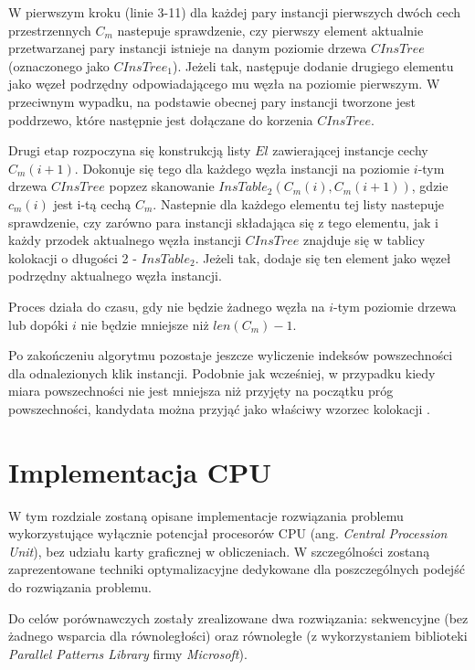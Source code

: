 \documentclass[12pt]{article}
\begin{document}
W pierwszym kroku (linie 3-11) dla każdej pary instancji pierwszych dwóch cech przestrzennych $ C_{m} $ nastepuje sprawdzenie, czy pierwszy element aktualnie przetwarzanej pary instancji istnieje na danym poziomie drzewa $ CInsTree $ (oznaczonego jako $CInsTree_{1}$). Jeżeli tak, następuje dodanie drugiego elementu jako węzeł podrzędny odpowiadającego mu węzła na poziomie pierwszym. W przeciwnym wypadku, na podstawie obecnej pary instancji tworzone jest poddrzewo, które następnie jest dołączane do korzenia $ CInsTree $. 

Drugi etap rozpoczyna się konstrukcją listy $ El$ zawierającej instancje cechy $ C_{m}(i+1) $. Dokonuje się tego dla każdego węzła instancji na poziomie $i$-tym drzewa $CInsTree$ popzez skanowanie $ InsTable_{2}(C_{m}(i),C_{m}(i+1))$, gdzie $ c_{m}(i)$ jest i-tą cechą $ C_{m} $. Nastepnie dla każdego elementu tej listy nastepuje sprawdzenie, czy zarówno para instancji składająca się z tego elementu, jak i każdy przodek aktualnego węzła instancji $ CInsTree$ znajduje się w tablicy kolokacji o długości 2 - $InsTable_{2}$. Jeżeli tak, dodaje się ten element jako węzeł podrzędny aktualnego węzła instancji.

Proces działa do czasu, gdy nie będzie żadnego węzła na $ i $-tym poziomie drzewa lub dopóki $i$ nie będzie mniejsze niż $ len(C_{m}) - 1 $.

Po zakończeniu algorytmu pozostaje jeszcze wyliczenie indeksów powszechności dla odnalezionych klik instancji. Podobnie jak wcześniej, w przypadku kiedy miara powszechności nie jest mniejsza niż przyjęty na początku próg powszechności, kandydata można przyjąć jako właściwy wzorzec kolokacji \cite{huang}.

\newpage

\section{Implementacja CPU}
\label{sec:cpu}

W tym rozdziale zostaną opisane implementacje rozwiązania problemu \cite{chinczyki} wykorzystujące wyłącznie potencjał procesorów CPU (ang. \textit{Central Procession Unit}), bez udziału karty graficznej w obliczeniach. W szczególności zostaną zaprezentowane techniki optymalizacyjne dedykowane dla poszczególnych podejść do rozwiązania problemu. 

Do celów porównawczych zostały zrealizowane dwa rozwiązania: sekwencyjne (bez żadnego wsparcia dla równoległości) oraz równoległe (z wykorzystaniem biblioteki \textit{Parallel Patterns Library} firmy \textit{Microsoft}). 
\end{document}
